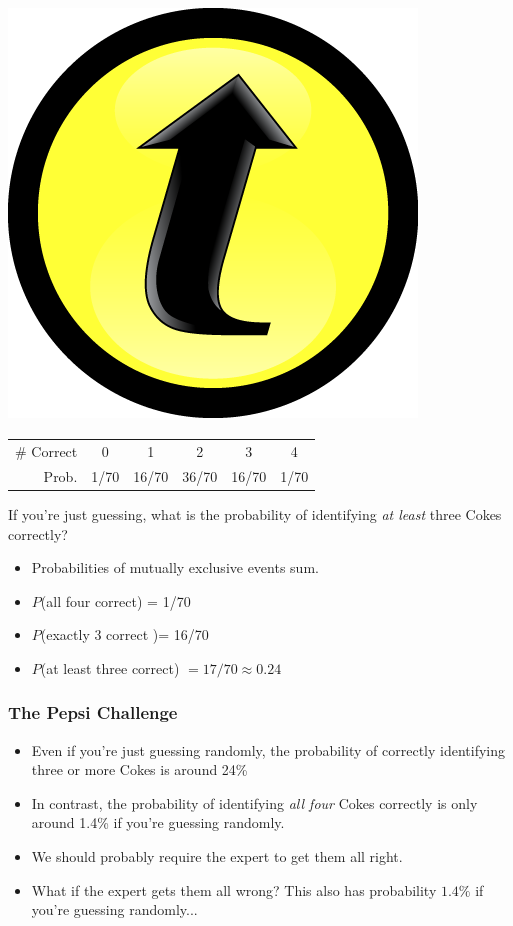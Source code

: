 \documentclass[handout]{beamer}
\begin{document}
\begin{frame}
	\frametitle{\includegraphics[scale = 0.05]{./images/clicker}}
	\begin{center}
		\begin{tabular}{rccccc}
		\hline
		\# Correct & 0 & 1 & 2 & 3 & 4\\
		Prob.&1/70 & 16/70 & 36/70 & 16/70 &1/70\\
		\hline
		\end{tabular}
	\end{center}
	If you're just guessing, what is the probability of identifying \alert{\emph{at least}} three Cokes correctly?
	\pause
	\begin{itemize}
\item Probabilities of mutually exclusive events sum. 
\item $P$(all four correct) = 1/70 
\item $P$(exactly 3 correct )= 16/70 
\item $P$(at least three correct) $ = 17/70 \approx 0.24$

\end{itemize}
\end{frame}

\begin{frame}
\frametitle{The Pepsi Challenge}
	\begin{itemize}
\item Even if you're just guessing randomly, the probability of correctly identifying three or more Cokes is around 24\% 
\item In contrast, the probability of identifying \emph{\alert{all four}} Cokes correctly is only around 1.4\% if you're guessing randomly. 
\item We should probably require the expert to get them all right. 
\item What if the expert gets them all wrong? This also has probability $1.4\%$ if you're guessing randomly...
\end{itemize}
\end{frame}
\end{document}
